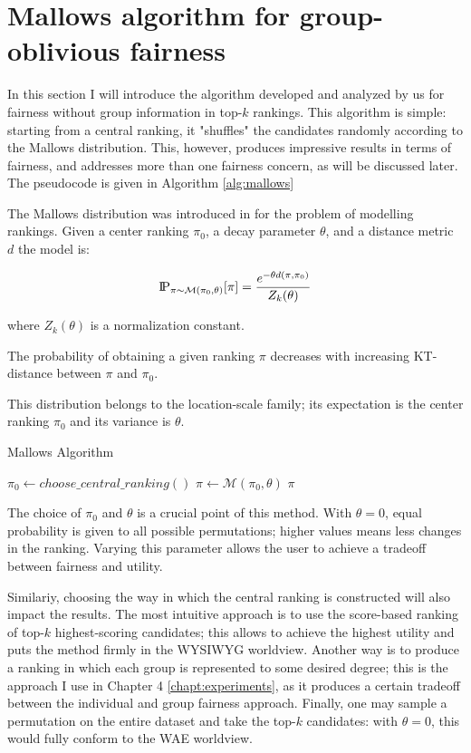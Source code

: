 \section{Mallows algorithm for group-oblivious fairness}

In this section I will introduce the algorithm developed and analyzed by us for fairness without group information in top-$k$ rankings. This algorithm is simple: starting from a central ranking, it "shuffles" the candidates randomly according to the Mallows distribution. This, however, produces impressive results in terms of fairness, and addresses more than one fairness concern, as will be discussed later. The pseudocode is given in Algorithm \ref{alg:mallows}

The Mallows distribution was introduced in \cite{mallows} for the problem of modelling rankings. Given a center ranking $\pi_0$, a decay parameter $\theta$, and a distance metric $d$ the model is:

\[
\text{I\kern-0.15em P}_{\pi \sim \mathcal{M}(\pi_0, \theta)}[\pi] = \frac {e^{-\theta d(\pi, \pi_0)}}{Z_k(\theta)}
\]

where $Z_k(\theta)$ is a normalization constant.

The probability of obtaining a given ranking $\pi$ decreases with increasing KT-distance between $\pi$ and $\pi_0$.

This distribution belongs to the location-scale family; its expectation is the center ranking $\pi_0$ and its variance is $\theta$.

\begin{algorithm}[h]
\caption{\small{Mallows Algorithm}}
\label{alg:mallows}
\small
\begin{algorithmic}[1]
\STATE $\pi_0 \leftarrow choose\_central\_ranking()$
\STATE $\pi \leftarrow \mathcal{M}(\pi_0, \theta)$
\RETURN $\pi$
\end{algorithmic}
\vspace{-1ex}
\end{algorithm}

The choice of $\pi_0$ and $\theta$ is a crucial point of this method. With $\theta = 0$, equal probability is given to all possible permutations; higher values means less changes in the ranking. Varying this parameter allows the user to achieve a tradeoff between fairness and utility.

Similariy, choosing the way in which the central ranking is constructed will also impact the results. The most intuitive approach is to use the score-based ranking of top-$k$ highest-scoring candidates; this allows to achieve the highest utility and puts the method firmly in the WYSIWYG worldview. Another way is to produce a ranking in which each group is represented to some desired degree; this is the approach I use in Chapter 4 \ref{chapt:experiments}, as it produces a certain tradeoff between the individual and group fairness approach. Finally, one may sample a permutation on the entire dataset and take the top-$k$ candidates: with $\theta = 0$, this would fully conform to the WAE worldview.

